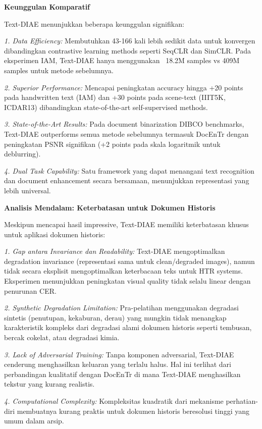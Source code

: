 \documentclass[12pt,a4paper]{article}
\begin{document}
\textbf{Keunggulan Komparatif}

Text-DIAE menunjukkan beberapa keunggulan signifikan:

\textit{1. Data Efficiency:} Membutuhkan 43-166 kali lebih sedikit data untuk konvergen dibandingkan contrastive learning methods seperti SeqCLR dan SimCLR. Pada eksperimen IAM, Text-DIAE hanya menggunakan ~18.2M samples vs 409M samples untuk metode sebelumnya.

\textit{2. Superior Performance:} Mencapai peningkatan accuracy hingga +20 points pada handwritten text (IAM) dan +30 points pada scene-text (IIIT5K, ICDAR13) dibandingkan state-of-the-art self-supervised methods.

\textit{3. State-of-the-Art Results:} Pada document binarization DIBCO benchmarks, Text-DIAE outperforms semua metode sebelumnya termasuk DocEnTr dengan peningkatan PSNR signifikan (+2 points pada skala logaritmik untuk deblurring).

\textit{4. Dual Task Capability:} Satu framework yang dapat menangani text recognition dan document enhancement secara bersamaan, menunjukkan representasi yang lebih universal.

\textbf{Analisis Mendalam: Keterbatasan untuk Dokumen Historis}

Meskipun mencapai hasil impressive, Text-DIAE memiliki keterbatasan khusus untuk aplikasi dokumen historis:

\textit{1. Gap antara Invariance dan Readability:}
Text-DIAE mengoptimalkan degradation invariance (representasi sama untuk clean/degraded images), namun tidak secara eksplisit mengoptimalkan keterbacaan teks untuk HTR systems. Eksperimen menunjukkan peningkatan visual quality tidak selalu linear dengan penurunan CER.

\textit{2. Synthetic Degradation Limitation:}
Pra-pelatihan menggunakan degradasi sintetis (penutupan, kekaburan, derau) yang mungkin tidak menangkap karakteristik kompleks dari degradasi alami dokumen historis seperti tembusan, bercak cokelat, atau degradasi kimia.

\textit{3. Lack of Adversarial Training:}
Tanpa komponen adversarial, Text-DIAE cenderung menghasilkan keluaran yang terlalu halus. Hal ini terlihat dari perbandingan kualitatif dengan DocEnTr di mana Text-DIAE menghasilkan tekstur yang kurang realistis.

\textit{4. Computational Complexity:}
Kompleksitas kuadratik dari mekanisme perhatian-diri membuatnya kurang praktis untuk dokumen historis beresolusi tinggi yang umum dalam arsip.
\end{document}
